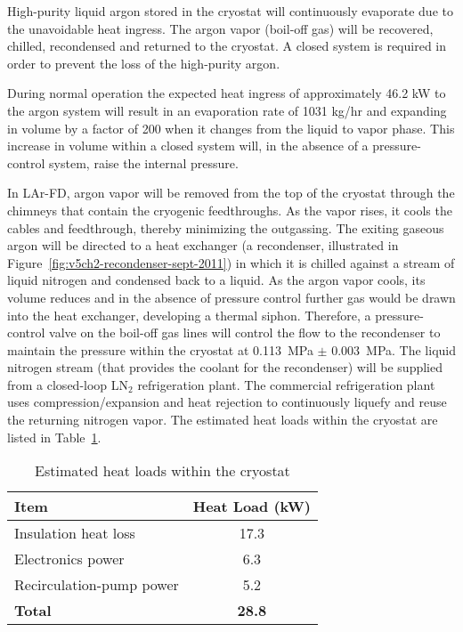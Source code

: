 High-purity liquid argon stored in the cryostat will continuously evaporate due to the unavoidable heat ingress.  The argon vapor (boil-off gas) will be recovered, chilled, recondensed and returned to the 
cryostat. A closed system is required in order to prevent the loss of the high-purity argon.

During normal operation the expected heat ingress of approximately 46.2 kW to the argon
system will result in an evaporation rate of
1031 kg/hr and expanding in
volume by a factor of 200 when it changes from the liquid to vapor phase. This increase in
volume within a closed system will, in the absence of a pressure-control system, raise the
internal pressure.

In LAr-FD, argon vapor will be removed from the top of the cryostat through the chimneys that contain the cryogenic feedthroughs. As the vapor rises, it cools the cables and feedthrough, thereby minimizing the outgassing. 
The exiting gaseous argon will be directed to a heat exchanger (a recondenser, illustrated in Figure~\ref{fig:v5ch2-recondenser-sept-2011}) in which it is chilled against a stream of liquid nitrogen and condensed back to a liquid. 
As the argon vapor cools, its volume reduces and in the absence of pressure control
further gas would be drawn into the heat exchanger, developing a thermal siphon.  Therefore, a pressure-control valve on 
the boil-off gas lines will control the flow to the recondenser to maintain the pressure within the cryostat  at 0.113~MPa $\pm$ 0.003~MPa.  
The liquid nitrogen stream (that provides the coolant for the recondenser) 
 will be supplied from a closed-loop LN$_{2}$ refrigeration plant.  The commercial refrigeration plant uses compression/expansion and heat rejection to continuously liquefy and reuse the returning nitrogen vapor. The estimated heat loads within the cryostat are listed in Table~\ref{table:cryo-heat-loads}.
 
\begin{table}
\centering
\caption{Estimated heat loads within the cryostat}
\label{table:cryo-heat-loads}
\begin{tabular}[htbp]{|l|c|}
\hline
{\bf Item} & {\bf Heat Load (kW)}\\
\hline
Insulation heat loss & 17.3  \\
\hline
Electronics power & 6.3  \\
\hline
Recirculation-pump power & 5.2  \\
\hline
{\bf Total} & {\bf 28.8 } \\
\hline
\end{tabular} 
\end{table}


